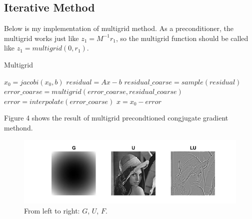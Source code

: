 \documentclass{article}
\begin{document}
\subsection{Iterative Method}
Below is my implementation of multigrid method. As a preconditioner, the multigrid works just like $z_1=M^{-1}r_1$, so the multigrid function should be called like $z_1=multigrid(0,r_1)$.
\begin{algorithm}  [H]
\caption{Multigrid}\label{algo1}
    \begin{algorithmic}
                
                    \State $x_0=jacobi(x_0,b)$ 
                \EndFor
                \State $residual = Ax-b$ 
                \State $residual\_coarse=sample(residual)$ 
                    \State $error\_coarse = multigrid(error\_coarse, residual\_coarse)$
                \EndIf
                \State $error=interpolate(error\_coarse)$ 
                \State $x=x_0-error$ 
                \State {}
            \EndFunction
        \end{algorithmic}  
\end{algorithm} 
Figure 4 shows the result of multigrid precondtioned congjugate gradient methond.
\begin{figure}[H]
   \centering
   \includegraphics[scale=0.8]{figure/cgmg.jpg}
   \caption{From left to right: $G$, $U$, $F$.}
\end{figure}

\newpage
\end{document}
